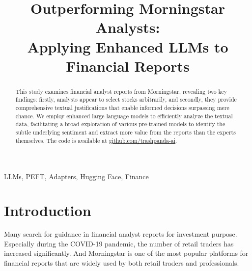 \documentclass[conference]{IEEEtran}
\begin{document}
\title{Outperforming Morningstar Analysts: \\ Applying Enhanced LLMs to Financial Reports
}

\author{
\and
{}
}

\maketitle

\begin{abstract}
This study examines financial analyst reports from Morningstar, revealing two key findings: firstly, analysts appear to select stocks arbitrarily, and secondly, they provide comprehensive textual justifications that enable informed decisions surpassing mere chance. We employ enhanced large language models to efficiently analyze the textual data, facilitating a broad exploration of various pre-trained models to identify the subtle underlying sentiment and extract more value from the reports than the experts themselves. The code is available at \href{https://github.com/trashpanda-ai/Advanced-Analytics-and-Machine-Learning}{github.com/trashpanda-ai}. %
\end{abstract}

\begin{IEEEkeywords}
LLMs, PEFT, Adapters, Hugging Face, Finance
\end{IEEEkeywords}

\section{Introduction}
Many search for guidance in financial analyst reports for investment purpose. Especially during the COVID-19 pandemic, the number of retail traders has increased significantly. And Morningstar is one of the most popular platforms for financial reports that are widely used by both retail traders and professionals.
\end{document}
